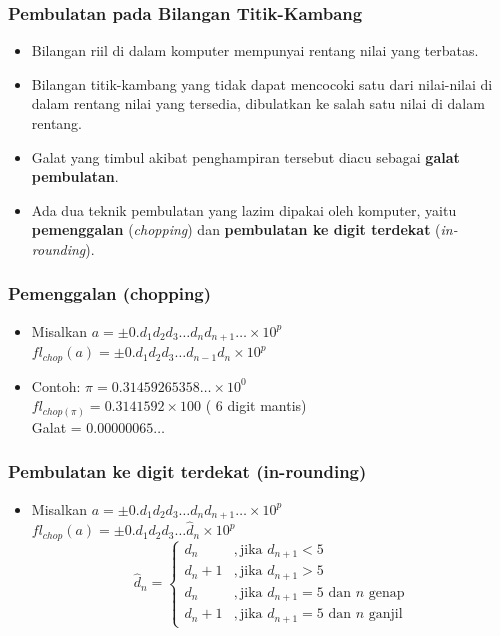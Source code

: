 \documentclass[pdflatex,compress]{beamer}
\begin{document}
\begin{frame}
	\frametitle{Pembulatan pada Bilangan Titik-Kambang}
	\begin{itemize}
		\item Bilangan riil di dalam komputer mempunyai rentang nilai yang terbatas.
		\item Bilangan titik-kambang yang tidak dapat mencocoki satu dari nilai-nilai di dalam rentang nilai yang tersedia, dibulatkan ke salah satu nilai di dalam rentang.
		\item Galat yang timbul akibat penghampiran tersebut diacu sebagai \textbf{galat pembulatan}.
		\item Ada dua teknik pembulatan yang lazim dipakai oleh komputer, yaitu \textbf{pemenggalan} (\textit{chopping}) dan \textbf{pembulatan ke digit terdekat} (\textit{in-rounding}).
	\end{itemize}
\end{frame}

\begin{frame}
	\frametitle{Pemenggalan (chopping)}
	\begin{itemize}
		\item Misalkan $ a = \pm 0.d_1 d_2 d_3 \dots d_nd_{n+1} \dots \times 10^p $\\
		$ fl_{chop}(a) = \pm 0.d_1 d_2 d_3 \dots d_{n-1}d_n \times 10^p $
		\item Contoh: $ \pi = 0.31459265358 \dots \times 10^0 $\\
		$ fl_{chop(\pi)} = 0.3141592 × 100 $ ( 6 digit mantis)\\
		Galat = $ 0.00000065\dots $
	\end{itemize}
\end{frame}

\begin{frame}
	\frametitle{Pembulatan ke digit terdekat (in-rounding)}
	\begin{itemize}
		\item Misalkan $ a = \pm 0.d_1 d_2 d_3 \dots d_n d_{n+1} \dots \times 10^p $\\
		$ fl_{chop}(a) = \pm 0.d_1 d_2 d_3 \dots \hat{d}_n \times 10^p $
		\[
		\hat{d}_n = 
			\begin{cases}
				d_n 	&, \text{jika } d_{n+1} < 5 \\
				d_n + 1 &, \text{jika } d_{n+1} > 5 \\
				d_n 	&, \text{jika } d_{n+1} = 5 \text{ dan } n \text{ genap}\\
				d_n + 1 &, \text{jika } d_{n+1} = 5 \text{ dan } n \text{ ganjil}
			\end{cases}
		\]
	\end{itemize}
\end{frame}
\end{document}
